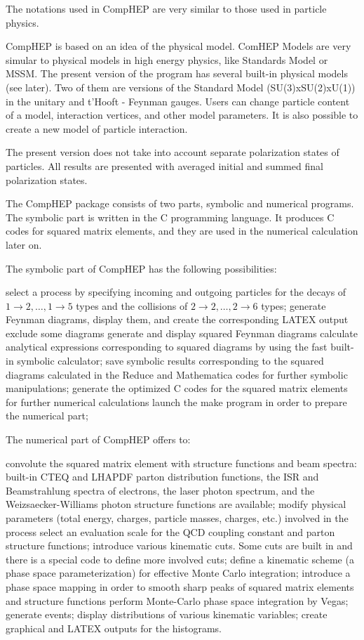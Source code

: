 The notations used in CompHEP are very similar to those used in particle physics.

CompHEP is based on an idea of the physical model. ComHEP Models are very simular to physical models in high energy physics, like Standards Model or MSSM. The present version of the program has several built-in physical models (see later). Two of them are versions of the Standard Model (SU(3)xSU(2)xU(1)) in the unitary and t'Hooft - Feynman gauges. Users can change particle content of a model, interaction vertices, and other model parameters. It is also possible to create a new model of particle interaction.

The present version does not take into account separate polarization states of particles. All results are presented with averaged initial and summed final polarization states.

The CompHEP package consists of two parts, symbolic and numerical programs. The symbolic part is written in the C programming language. It produces C codes for squared matrix elements, and they are used in the numerical calculation later on.

The symbolic part of CompHEP has the following possibilities:

      select a process by specifying incoming and outgoing particles for the decays of $1 \rightarrow 2, \ldots ,1 \rightarrow 5$ types and the collisions of $2 \rightarrow 2, \ldots , 2 \rightarrow 6$ types;
      generate Feynman diagrams, display them, and create the corresponding LATEX output
      exclude some diagrams
      generate and display squared Feynman diagrams
      calculate analytical expressions corresponding to squared diagrams by using the fast built-in symbolic calculator;
      save symbolic results corresponding to the squared diagrams calculated in the Reduce and Mathematica codes for further symbolic manipulations;
      generate the optimized C codes for the squared matrix elements for further numerical calculations
      launch the make program in order to prepare the numerical part;

The numerical part of CompHEP offers to:

      convolute the squared matrix element with structure functions and beam spectra: built-in CTEQ and LHAPDF parton distribution functions, the ISR and Beamstrahlung spectra of electrons, the laser photon spectrum, and the Weizsaecker-Williams photon structure functions are available;
      modify physical parameters (total energy, charges, particle masses, charges, etc.) involved in the process
      select an evaluation scale for the QCD coupling constant and parton structure functions;
      introduce various kinematic cuts. Some cuts are built in and there is a special code to define more involved cuts;
      define a kinematic scheme (a phase space parameterization) for effective Monte Carlo integration;
      introduce a phase space mapping in order to smooth sharp peaks of squared matrix elements and structure functions
      perform Monte-Carlo phase space integration by Vegas;
      generate events;
      display distributions of various kinematic variables;
      create graphical and LATEX outputs for the histograms.

